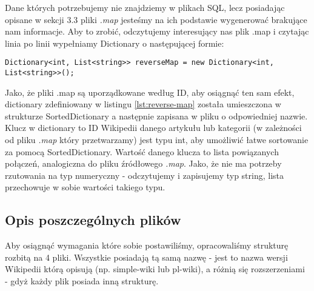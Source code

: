 Dane których potrzebujemy nie znajdziemy w plikach SQL, lecz posiadając opisane w sekcji 3.3 pliki \textit{.map} jesteśmy na ich podstawie wygenerować brakujące nam informacje.
Aby to zrobić, odczytujemy interesujący nas plik .map i czytając linia po linii wypełniamy Dictionary o następującej formie:

\begin{lstlisting}[caption={Dictionary przechowujące odwzorowanie odwrotne}, label=lst:reverse-map]
Dictionary<int, List<string>> reverseMap = new Dictionary<int, List<string>>();
\end{lstlisting}
Jako, że pliki .map są uporządkowane według ID, aby osiągnąć ten sam efekt, dictionary zdefiniowany w listingu \ref{lst:reverse-map} została umieszczona w strukturze SortedDictionary a następnie zapisana w pliku o odpowiedniej nazwie. 
Klucz w dictionary to ID Wikipedii danego artykułu lub kategorii (w zależności od pliku \textit{.map} który przetwarzamy) jest typu int, aby umożliwić łatwe sortowanie za pomocą SortedDictionary. Wartość danego klucza to lista powiązanych połączeń, analogiczna do pliku źródłowego \textit{.map}. Jako, że nie ma potrzeby rzutowania na typ numeryczny - odczytujemy i zapisujemy typ string, lista przechowuje w sobie wartości takiego typu.

\subsection{Opis poszczególnych plików}
Aby osiągnąć wymagania które sobie postawiliśmy, opracowaliśmy strukturę rozbitą na 4 pliki. Wszystkie posiadają tą samą nazwę - jest to nazwa wersji Wikipedii którą opisują (np. simple-wiki lub pl-wiki), a różnią się rozszerzeniami - gdyż każdy plik posiada inną strukturę.

